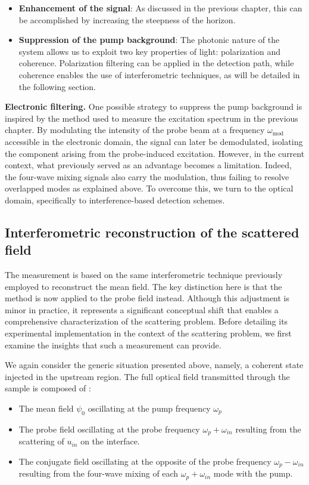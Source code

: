 \begin{itemize}
    \item \textbf{Enhancement of the signal}: As discussed in the previous chapter, this can be accomplished by increasing the steepness of the horizon.
    \item \textbf{Suppression of the pump background}: The photonic nature of the system allows us to exploit two key properties of light: polarization and coherence. Polarization filtering can be applied in the detection path, while coherence enables the use of interferometric techniques, as will be detailed in the following section.
\end{itemize}

\textbf{Electronic filtering.} One possible strategy to suppress the pump background is inspired by the method used to measure the excitation spectrum in the previous chapter. By modulating the intensity of the probe beam at a frequency \(\omega_{\text{mod}}\) accessible in the electronic domain, the signal can later be demodulated, isolating the component arising from the probe-induced excitation. However, in the current context, what previously served as an advantage becomes a limitation. Indeed, the four-wave mixing signals also carry the modulation, thus failing to resolve overlapped modes as explained above. To overcome this, we turn to the optical domain, specifically to interference-based detection schemes.

\subsection{Interferometric reconstruction of the scattered field}

The measurement is based on the same interferometric technique previously employed to reconstruct the mean field.
 The key distinction here is that the method is now applied to the probe field instead. Although this adjustment is minor in practice, it represents a significant conceptual shift that enables a comprehensive characterization of the scattering problem. 
Before detailing its experimental implementation in the context of the scattering problem, we first examine the insights that such a measurement can provide.

\bigskip

We again consider the generic situation presented above, namely, a coherent state injected in the upstream region. The full optical field transmitted through
the sample is composed of :

\begin{itemize}
    \item The mean field $\psi_0$ oscillating at the pump frequency $\omega_p$
    \item The probe field oscillating at the probe frequency $\omega_p+\omega_{in}$ resulting from the scattering of $u_{in}$ on the interface.
    \item The conjugate field oscillating at the opposite of the probe frequency $\omega_p-\omega_{in}$ resulting from the four-wave mixing of each $\omega_p+\omega_{in}$ mode with the pump. 
\end{itemize}


